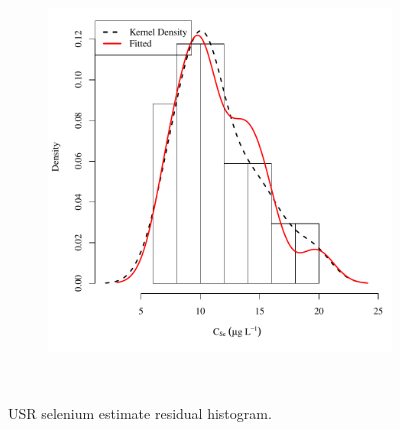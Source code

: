 \begin{landscape}
\begin{figure}
\begin{subfigure}{0.7\textwidth}
			\includegraphics[width=\tableCustomSize]{"Figures/Results_USR/Stochastic/Conc Model ResDist CAN"}
		\end{subfigure}\\
		\caption{USR selenium estimate residual histogram.}
	\end{figure}
\end{landscape}

